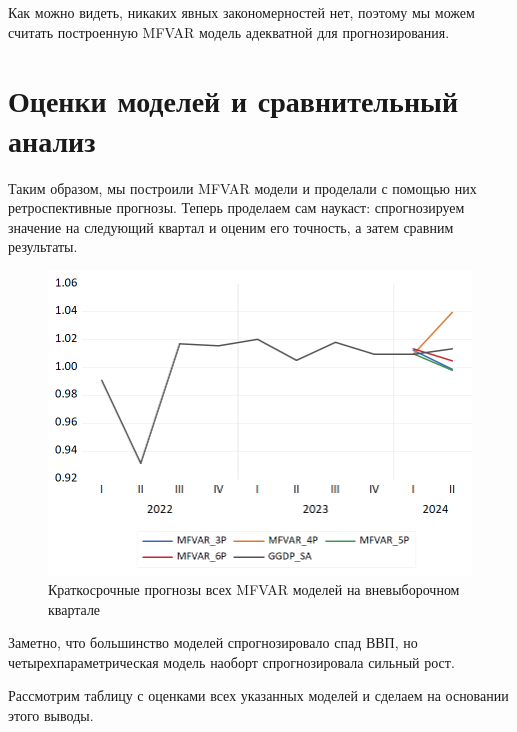 \documentclass[a4paper, 14pt]{extreport}
\numberwithin{equation}{subsection}
\numberwithin{equation}{section}
\begin{document}
	Как можно видеть, никаких явных закономерностей нет, поэтому мы можем считать построенную MFVAR модель адекватной для прогнозирования.
	\newpage
	\section{Оценки моделей и сравнительный анализ}
	Таким образом, мы построили MFVAR модели и проделали с помощью них ретроспективные прогнозы. Теперь проделаем сам наукаст: спрогнозируем значение на следующий квартал и оценим его точность, а затем сравним результаты.
	
	\begin{figure}[h!]
		\centering
		\includegraphics[scale=0.5]{images/img23}
		\caption{Краткосрочные прогнозы всех MFVAR моделей на вневыборочном квартале}
		\label{fig:img23}
	\end{figure}
	
	Заметно, что большинство моделей спрогнозировало спад ВВП, но четырехпараметрическая модель наоборт спрогнозировала сильный рост.
	
	Рассмотрим таблицу с оценками всех указанных моделей и сделаем на основании этого выводы.
	
\end{document}
